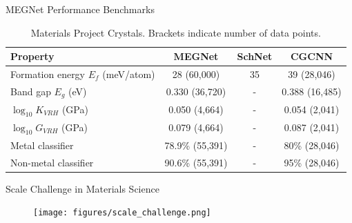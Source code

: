 \documentclass[aspectratio=169]{beamer}
\begin{document}
    \begin{frame}{MEGNet Performance Benchmarks}
        \footnotesize
        \begin{table}[]
            \centering
            \begin{tabular}{l|c|c|c}
                Property                          & MEGNet          & SchNet & CGCNN          \\
                \hline
                Formation energy $E_f$ (meV/atom) & 28 (60,000)     & 35     & 39 (28,046)    \\
                Band gap $E_g$ (eV)               & 0.330 (36,720)  & -      & 0.388 (16,485) \\
                $\log_{10} K_{VRH}$ (GPa)         & 0.050 (4,664)   & -      & 0.054 (2,041)  \\
                $\log_{10} G_{VRH}$ (GPa)         & 0.079 (4,664)   & -      & 0.087 (2,041)  \\
                Metal classifier                  & 78.9\% (55,391) & -      & 80\% (28,046)  \\
                Non-metal classifier              & 90.6\% (55,391) & -      & 95\% (28,046)
            \end{tabular}
            \caption{Materials Project Crystals. Brackets indicate number of data points.}
        \end{table}
    \end{frame}


    \begin{frame}{Scale Challenge in Materials Science}
        \begin{figure}
            \centering
            \texttt{[image: figures/scale\_challenge.png]}
        \end{figure}
    \end{frame}
\end{document}
